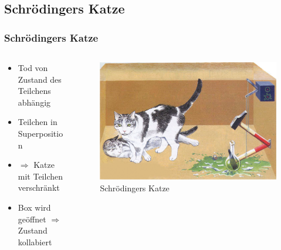 \documentclass{beamer}
\begin{document}
\subsection{Schrödingers Katze}
\begin{frame}
	\frametitle{Schrödingers Katze}
	\begin{columns}
		\begin{column}{0.5\textwidth}
			\begin{itemize}
				\item Tod von Zustand des Teilchens abhängig
				\item Teilchen in Superposition
				\item $\Rightarrow$ Katze mit Teilchen verschränkt
				\item Box wird geöffnet $\Rightarrow$ Zustand kollabiert
			\end{itemize}
		\end{column}
		\begin{column}{0.5\textwidth}
			\begin{figure}
				\center\includegraphics[width=1\textwidth]{images/scat.png}
				\caption{Schrödingers Katze\cite{lect}}
			\end{figure}
		\end{column}
	\end{columns}
\end{frame}
\end{document}
